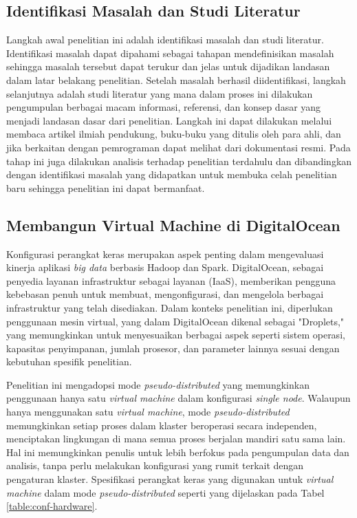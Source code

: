 \subsection{Identifikasi Masalah dan Studi Literatur}
Langkah awal penelitian ini adalah identifikasi masalah dan studi literatur. Identifikasi masalah dapat dipahami sebagai tahapan mendefinisikan masalah sehingga masalah tersebut dapat terukur dan jelas untuk dijadikan landasan dalam latar belakang penelitian. Setelah masalah berhasil diidentifikasi, langkah selanjutnya adalah studi literatur yang mana dalam proses ini dilakukan pengumpulan berbagai macam informasi, referensi, dan konsep dasar yang menjadi landasan dasar dari penelitian. Langkah ini dapat dilakukan melalui membaca artikel ilmiah pendukung, buku-buku yang ditulis oleh para ahli, dan jika berkaitan dengan pemrograman dapat melihat dari dokumentasi resmi. Pada tahap ini juga dilakukan analisis terhadap penelitian terdahulu dan dibandingkan dengan identifikasi masalah yang didapatkan untuk membuka celah penelitian baru sehingga penelitian ini dapat bermanfaat. 

\subsection{Membangun Virtual Machine di DigitalOcean}
Konfigurasi perangkat keras merupakan aspek penting dalam mengevaluasi kinerja aplikasi \textit{big data} berbasis Hadoop dan Spark. DigitalOcean, sebagai penyedia layanan infrastruktur sebagai layanan (IaaS), memberikan pengguna kebebasan penuh untuk membuat, mengonfigurasi, dan mengelola berbagai infrastruktur yang telah disediakan. Dalam konteks penelitian ini, diperlukan penggunaan mesin virtual, yang dalam DigitalOcean dikenal sebagai "Droplets," yang memungkinkan untuk menyesuaikan berbagai aspek seperti sistem operasi, kapasitas penyimpanan, jumlah prosesor, dan parameter lainnya sesuai dengan kebutuhan spesifik penelitian.

Penelitian ini mengadopsi mode \textit{pseudo-distributed} yang memungkinkan penggunaan hanya satu \textit{virtual machine} dalam konfigurasi \textit{single node}. Walaupun hanya menggunakan satu \textit{virtual machine}, mode \textit{pseudo-distributed} memungkinkan setiap proses dalam klaster beroperasi secara independen, menciptakan lingkungan di mana semua proses berjalan mandiri satu sama lain. Hal ini memungkinkan penulis untuk lebih berfokus pada pengumpulan data dan analisis, tanpa perlu melakukan konfigurasi yang rumit terkait dengan pengaturan klaster. Spesifikasi perangkat keras yang digunakan untuk \textit{virtual machine} dalam mode \textit{pseudo-distributed} seperti yang dijelaskan pada Tabel \ref{table:conf-hardware}.

